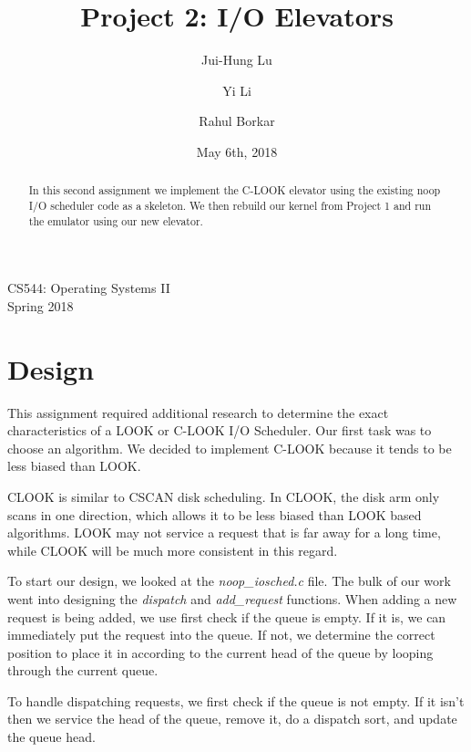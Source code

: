 \documentclass[onecolumn, draftclsnofoot,10pt, compsoc]{IEEEtran}
\title{Project 2: I/O Elevators}
\author{
  Jui-Hung Lu \hspace{1cm}
  \and
  Yi Li \hspace{1cm}
  \and
  Rahul Borkar
}
\date{May 6th, 2018}
\begin{document}
\begin{titlepage}

\maketitle
\begin{center}
CS544: Operating Systems II \\
Spring 2018
\vspace{50 mm}
\end{center}
\begin{abstract}
In this second assignment we implement the C-LOOK elevator using the existing noop I/O scheduler code as a skeleton. We then rebuild our kernel from Project 1 and run the emulator using our new elevator. 
\end{abstract}
\end{titlepage}
\section{Design}
This assignment required additional research to determine the exact characteristics of a LOOK or C-LOOK I/O Scheduler. Our first task was to choose an algorithm. We decided to implement C-LOOK because it tends to be less biased than LOOK.

CLOOK is similar to CSCAN disk scheduling. In CLOOK, the disk arm only scans in one direction, which allows it to be less biased than LOOK based algorithms. LOOK may not service a request that is far away for a long time, while CLOOK will be much more consistent in this regard.

To start our design, we looked at the \textit{noop\_iosched.c} file. The bulk of our work went into designing the \textit{dispatch} and \textit{add\_request} functions. When adding a new request is being added, we use first check if the queue is empty. If it is, we can immediately put the request into the queue. If not, we determine the correct position to place it in according to the current head of the queue by looping through the current queue.

To handle dispatching requests, we first check if the queue is not empty. If it isn't then we service the head of the queue, remove it, do a dispatch sort, and update the queue head.
\end{document}
